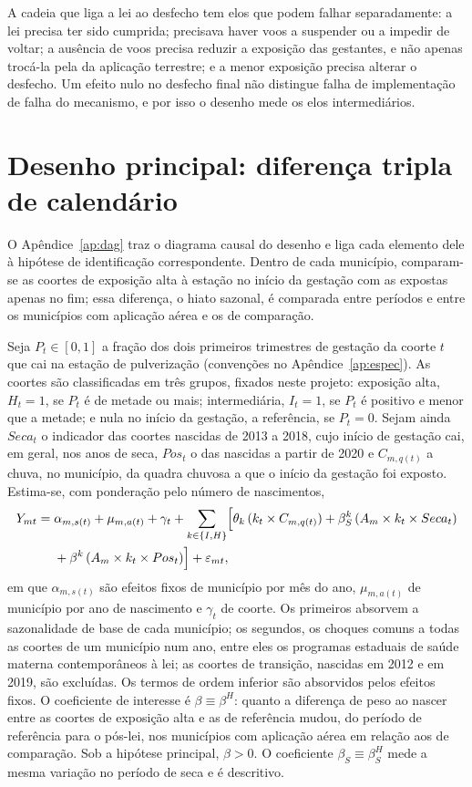 A cadeia que liga a lei ao desfecho tem elos que podem falhar separadamente: a
lei precisa ter sido cumprida; precisava haver voos a suspender ou a impedir
de voltar; a ausência de voos precisa reduzir a exposição das gestantes, e não
apenas trocá-la pela da aplicação terrestre; e a menor exposição precisa
alterar o desfecho. Um efeito nulo no desfecho final não distingue falha de implementação de
falha do mecanismo, e por isso o desenho mede os elos intermediários.

\section{Desenho principal: diferença tripla de calendário}
\label{sec:calendario}

O Apêndice~\ref{ap:dag} traz o diagrama causal do desenho e liga cada
elemento dele à hipótese de identificação correspondente. Dentro de cada município, comparam-se as coortes de
exposição alta à estação no início da gestação com as expostas apenas no fim;
essa diferença, o hiato sazonal, é comparada entre períodos e entre os
municípios com aplicação aérea e os de comparação.

Seja $P_t \in [0,1]$ a fração dos dois primeiros trimestres de gestação da
coorte $t$ que cai na estação de pulverização (convenções no
Apêndice~\ref{ap:espec}). As coortes são classificadas em
três grupos, fixados neste projeto: exposição alta, $H_t = 1$, se $P_t$ é de
metade ou mais; intermediária, $I_t = 1$, se $P_t$ é positivo e menor que a
metade; e nula no início da gestação, a referência, se $P_t = 0$. Sejam ainda
$Seca_t$ o indicador das coortes nascidas de 2013 a 2018, cujo início de
gestação cai, em geral, nos anos de seca, $Pos_t$ o das
nascidas a partir de 2020 e $C_{m,q(t)}$ a chuva, no município, da quadra
chuvosa a que o início da gestação foi exposto. Estima-se, com ponderação pelo número de nascimentos,
\begin{equation}
\begin{split}
  Y_{mt} ={}& \alpha_{m,s(t)} + \mu_{m,a(t)} + \gamma_t
   + \sum_{k \in \{I,H\}} \Bigl[\theta_k\,(k_t \times C_{m,q(t)})
   + \beta^k_S\,(A_m \times k_t \times Seca_t) \\
  & + \beta^k\,(A_m \times k_t \times Pos_t)\Bigr] + \varepsilon_{mt},
\end{split}
\label{eq:ddd}
\end{equation}
em que $\alpha_{m,s(t)}$ são efeitos fixos de município por mês do ano,
$\mu_{m,a(t)}$ de município por ano de nascimento e $\gamma_t$ de coorte. Os
primeiros absorvem a sazonalidade de base de cada município; os segundos, os
choques comuns a todas as coortes de um município num ano, entre eles os
programas estaduais de saúde materna contemporâneos à lei; as coortes de
transição, nascidas em 2012 e em 2019, são excluídas. Os termos de
ordem inferior são absorvidos pelos efeitos fixos. O coeficiente de
interesse é $\beta \equiv \beta^H$: quanto a diferença de peso ao nascer entre
as coortes de exposição alta e as de referência mudou, do período de
referência para o pós-lei, nos municípios com aplicação aérea em relação aos
de comparação. Sob a hipótese principal, $\beta > 0$. O coeficiente
$\beta_S \equiv \beta^H_S$ mede a mesma variação no período de seca e é
descritivo.

